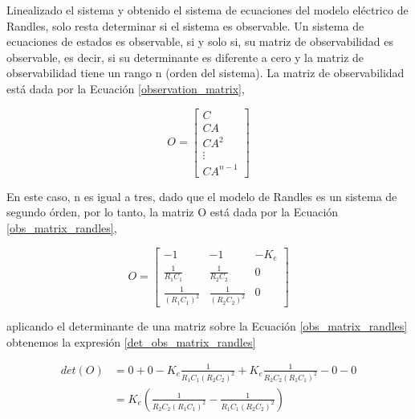 \documentclass[10pt,a4paper]{article}
\newcounter{subsubsubsection}[subsubsection]
\begin{document}
\newpage


Linealizado el sistema y obtenido el sistema de ecuaciones del modelo
el\'ectrico de Randles, solo resta determinar si el sistema es observable. Un
sistema de ecuaciones de estados es observable, si y solo si, su matriz de
observabilidad es observable, es decir, si su determinante es diferente a cero y
la matriz de observabilidad tiene un rango n (orden del sistema). La matriz de 
observabilidad est\'a dada por la Ecuaci\'on \ref{observation_matrix},

\begin{equation}
    O = \begin{bmatrix}
        C\\
        CA\\
        CA^2\\
        \vdots\\
        CA^{n-1}
        \end{bmatrix}\label{observation_matrix}
\end{equation}

En este caso, n es igual a tres, dado que el modelo de Randles es un sistema de 
segundo \'orden, por lo tanto, la matriz O est\'a dada por la Ecuaci\'on 
\ref{obs_matrix_randles},

\begin{equation}
    O = \begin{bmatrix}
        -1 & -1 & -K_e \\
        \frac{1}{R_1C_1} & \frac{1}{R_2C_2} & 0 \\
        \frac{1}{\left(R_1C_1\right)^2} & \frac{1}{\left(R_2C_2\right)^2} & 0
        \end{bmatrix}\label{obs_matrix_randles}
\end{equation}

aplicando el determinante de una matriz sobre la Ecuaci\'on
\ref{obs_matrix_randles} obtenemos la expresi\'on \ref{det_obs_matrix_randles}

\begin{align}
    det\left(O\right) &= 0 + 0 -K_e \frac{1}{R_1C_1\left(R_2C_2\right)^2} + 
                        K_e \frac{1}{R_2C_2\left(R_1C_1\right)^2} - 0 -
                        0\nonumber\\
                      &= K_e \left(\frac{1}{R_2C_2\left(R_1C_1\right)^2} - 
                                   \frac{1}{R_1C_1\left(R_2C_2\right)^2}\right)
                                   \label{det_obs_matrix_randles}
\end{align}
\end{document}
